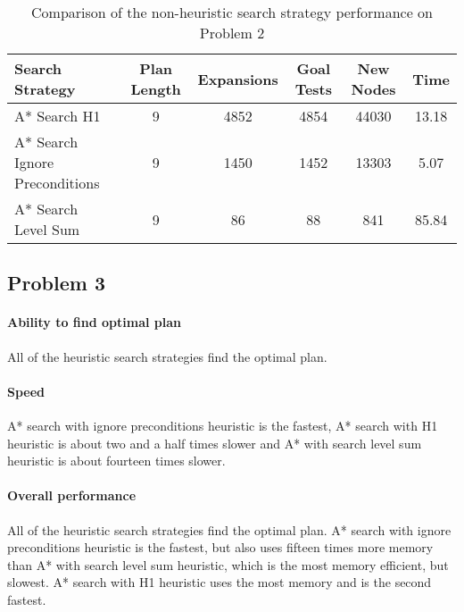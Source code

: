 \documentclass[11pt]{article}
\begin{document}
\begin{table}[H]
  \centering
  \caption{Comparison of the non-heuristic search strategy performance on Problem 2}
  \bigskip
  \label{table:hp2}
  \bgroup
  \def\arraystretch{1.5}
  \begin{tabular}{p{3.7cm}|c|c|c|c|c}
    Search Strategy & Plan Length & Expansions & Goal Tests & New Nodes & Time \\
    \hline
    A* Search H1 & 9 & 4852 & 4854 & 44030 & 13.18 \\
    A* Search Ignore Preconditions & 9 & 1450 & 1452 & 13303 & 5.07 \\
    A* Search Level Sum & 9 & 86 & 88 & 841 & 85.84 \\
  \end{tabular}
  \egroup
\end{table}

\subsection{Problem 3}

\paragraph{Ability to find optimal plan}

All of the heuristic search strategies find the optimal plan.

\paragraph{Speed}

A* search with ignore preconditions heuristic is the fastest, A* search with H1 heuristic is about two and a half times slower and A* with search level sum heuristic is about fourteen times slower.

\paragraph{Overall performance}

All of the heuristic search strategies find the optimal plan. A* search with ignore preconditions heuristic is the fastest, but also uses fifteen times more memory than A* with search level sum heuristic, which is the most memory efficient, but slowest. A* search with H1 heuristic uses the most memory and is the second fastest.
\end{document}
